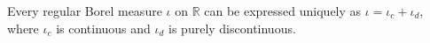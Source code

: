 Every regular Borel measure $\iota$ on $\mathbb{R}$ can be expressed uniquely as $\iota = \iota_c + \iota_d$, where $\iota_c$ is continuous and $\iota_d$ is purely discontinuous.
